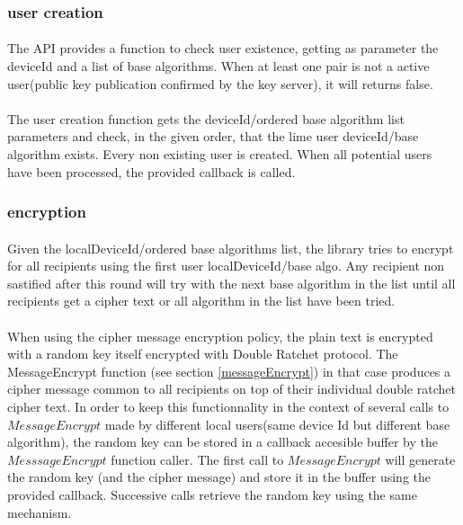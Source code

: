 \documentclass[a4paper,11pt]{article}
\begin{document}
  \subsubsection{user creation}
  \paragraph{}The API provides a function to check user existence, getting as parameter the deviceId and a list of base algorithms. When at least one pair is not a active user(public key publication confirmed by the key server), it will returns false.
  \paragraph{}The user creation function gets the deviceId/ordered base algorithm list parameters and check, in the given order, that the lime user deviceId/base algorithm exists. Every non existing user is created. When all potential users have been processed, the provided callback is called.
  \subsubsection{encryption}
  \paragraph{}Given the localDeviceId/ordered base algorithms list, the library tries to encrypt for all recipients using the first user localDeviceId/base algo. Any recipient non sastified after this round will try with the next base algorithm in the list until all recipients get a cipher text or all algorithm in the list have been tried.

  \paragraph{}When using the cipher message encryption policy, the plain text is encrypted with a random key itself encrypted with Double Ratchet protocol. The MessageEncrypt function (see section \ref{messageEncrypt}) in that case produces a cipher message common to all recipients on top of their individual double ratchet cipher text. In order to keep this functionnality in the context of several calls to $MessageEncrypt$ made by different local users(same device Id but different base algorithm), the random key can be stored in a callback accesible buffer by the $MesssageEncrypt$ function caller. The first call to $MessageEncrypt$ will generate the random key (and the cipher message) and store it in the buffer using the provided callback. Successive calls retrieve the random key using the same mechanism.
\end{document}

